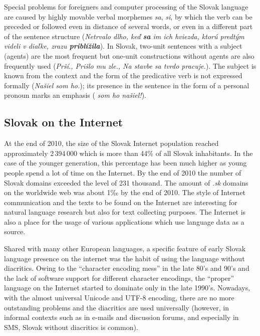 \begin{multicols}{2}

Special problems for foreigners and computer processing of the Slovak language are caused by highly movable verbal morphemes \emph{sa}, \emph{si}, by which the verb can be preceded or followed even in distance of several words, or even in a different part of the sentence structure (\emph{Netrvalo dlho, keď \textbf{sa} im ich hviezda, ktorú predtým videli v diaľke, zrazu \textbf{priblížila}}). In Slovak, two-unit sentences with a subject (agents) are the most frequent but one-unit constructions without agents are also frequently used (\emph{Prší., Prišlo mu zle., Na stavbe sa tvrdo pracuje.}). The subject is known from the context and the form of the predicative verb is not expressed formally (\emph{Našiel som ho.}); its presence in the sentence in the form of a personal pronoun marks an emphasis (\emph{ som ho našiel!}).

\subsection{Slovak on the Internet}
At the end of 2010, the size of the Slovak Internet population reached
approximately 2\,394\,000 which is more than 44\% of all Slovak
inhabitants. In the case of the younger generation, this percentage has
been much higher as young people spend a lot of time on the Internet. By
the end of 2010 the number of Slovak domains exceeded the level of 231
thousand\cite{f3}.
The amount of \emph{.sk} domains on the worldwide web was about
1‰\cite{f4} by the end of 2010. The style of Internet
communication and the texts to be found on the Internet are interesting
for natural language research but also for text collecting purposes. The 
Internet is also a place for the usage of various applications which use
language data as a source.  

Shared with many other European languages, a specific feature of early
Slovak language presence on the internet\cite{f5} was the habit of using the language without
diacritics. Owing to the “character encoding mess” in the late 80's
and 90's and the lack of software support for different character
encodings, the “proper” language on the Internet started to dominate
only in the late 1990's. Nowadays, with the almost universal Unicode and
UTF-8 encoding, there are no more outstanding problems and the
diacritics are used universally (however, in informal contexts such as
in e-mails and discussion forums, and especially in SMS, Slovak without
diacritics is common). 


\end{multicols}
